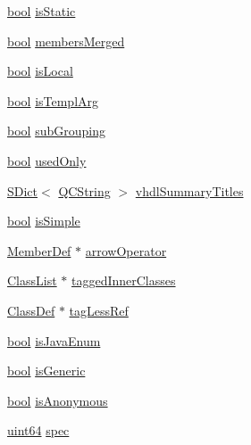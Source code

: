 \begin{DoxyCompactItemize}
\item 
\hyperlink{qglobal_8h_a1062901a7428fdd9c7f180f5e01ea056}{bool} \hyperlink{class_class_def_impl_a13a7bfbb253abb17959c8fa78d565c51}{is\+Static}
\item 
\hyperlink{qglobal_8h_a1062901a7428fdd9c7f180f5e01ea056}{bool} \hyperlink{class_class_def_impl_ab613a11051f5ad3265ddc3b25ef50a82}{members\+Merged}
\item 
\hyperlink{qglobal_8h_a1062901a7428fdd9c7f180f5e01ea056}{bool} \hyperlink{class_class_def_impl_a9a751bb93d4da92aceace3210c911aa1}{is\+Local}
\item 
\hyperlink{qglobal_8h_a1062901a7428fdd9c7f180f5e01ea056}{bool} \hyperlink{class_class_def_impl_a3a2227e55d99c40327f87f5efe096061}{is\+Templ\+Arg}
\item 
\hyperlink{qglobal_8h_a1062901a7428fdd9c7f180f5e01ea056}{bool} \hyperlink{class_class_def_impl_ad11ebe89f9a6c199c5ef2b63ef2a10cc}{sub\+Grouping}
\item 
\hyperlink{qglobal_8h_a1062901a7428fdd9c7f180f5e01ea056}{bool} \hyperlink{class_class_def_impl_aef5aa0ec452605576f9a976067326e52}{used\+Only}
\item 
\hyperlink{class_s_dict}{S\+Dict}$<$ \hyperlink{class_q_c_string}{Q\+C\+String} $>$ \hyperlink{class_class_def_impl_a1ab8fae1f7661cf9461678debaf0c5f7}{vhdl\+Summary\+Titles}
\item 
\hyperlink{qglobal_8h_a1062901a7428fdd9c7f180f5e01ea056}{bool} \hyperlink{class_class_def_impl_a066ef909e009befddbd31341b9ddbb5b}{is\+Simple}
\item 
\hyperlink{class_member_def}{Member\+Def} $\ast$ \hyperlink{class_class_def_impl_a94bc1b4ff18537f707b575ce6e60920c}{arrow\+Operator}
\item 
\hyperlink{class_class_list}{Class\+List} $\ast$ \hyperlink{class_class_def_impl_a8753bef2143ebdef9451738751087e5f}{tagged\+Inner\+Classes}
\item 
\hyperlink{class_class_def}{Class\+Def} $\ast$ \hyperlink{class_class_def_impl_a57431554d3d5190b38d8ce18b65f9b09}{tag\+Less\+Ref}
\item 
\hyperlink{qglobal_8h_a1062901a7428fdd9c7f180f5e01ea056}{bool} \hyperlink{class_class_def_impl_a435f18aa29bf28b0723ea7c7fd79b825}{is\+Java\+Enum}
\item 
\hyperlink{qglobal_8h_a1062901a7428fdd9c7f180f5e01ea056}{bool} \hyperlink{class_class_def_impl_ad8a4566782b5669e5a77978189900f75}{is\+Generic}
\item 
\hyperlink{qglobal_8h_a1062901a7428fdd9c7f180f5e01ea056}{bool} \hyperlink{class_class_def_impl_a65e6446458cf26ce8e39a55a5c111195}{is\+Anonymous}
\item 
\hyperlink{qglobal_8h_a29940ae63ec06c9998bba873e25407ad}{uint64} \hyperlink{class_class_def_impl_a9514ecc09bd2ee98965eb9bc6e0fa787}{spec}
\end{DoxyCompactItemize}


